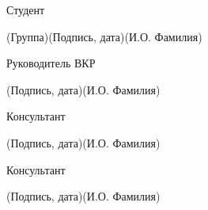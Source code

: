 \documentclass[14pt, russian]{scrartcl}
\begin{document}
\begin{titlepage}
\newlength{\ML}

\noindent Студент \underline{\hspace{1.5cm}} \hfill \underline{\hspace{4cm}}\quad
\underline{\hspace{4cm}}

\vspace{-2.1ex}
\noindent\hspace{9ex}\scriptsize{(Группа)}\normalsize\hspace{170pt}\hspace{2ex}\scriptsize{(Подпись, дата)}\normalsize\hspace{30pt}\hspace{6ex}\scriptsize{(И.О. Фамилия)}\normalsize

\bigskip

\noindent Руководитель ВКР \hfill \underline{\hspace{4cm}}\quad
\underline{\hspace{4cm}}

\vspace{-2ex}
\noindent\hspace{13.5ex}\normalsize\hspace{170pt}\hspace{2ex}\scriptsize{(Подпись, дата)}\normalsize\hspace{30pt}\hspace{6ex}\scriptsize{(И.О. Фамилия)}\normalsize
\bigskip

\noindent Консультант \hfill \underline{\hspace{4cm}}\quad
\underline{\hspace{4cm}}

\vspace{-2ex}
\noindent\hspace{13.5ex}\normalsize\hspace{170pt}\hspace{2ex}\scriptsize{(Подпись, дата)}\normalsize\hspace{30pt}\hspace{6ex}\scriptsize{(И.О. Фамилия)}\normalsize
\bigskip

\noindent Консультант \hfill \underline{\hspace{4cm}}\quad
\underline{\hspace{4cm}}

\vspace{-2ex}
\noindent\hspace{13.5ex}\normalsize\hspace{170pt}\hspace{2ex}\scriptsize{(Подпись, дата)}\normalsize\hspace{30pt}\hspace{6ex}\scriptsize{(И.О. Фамилия)}\normalsize


\end{titlepage}
\end{document}
